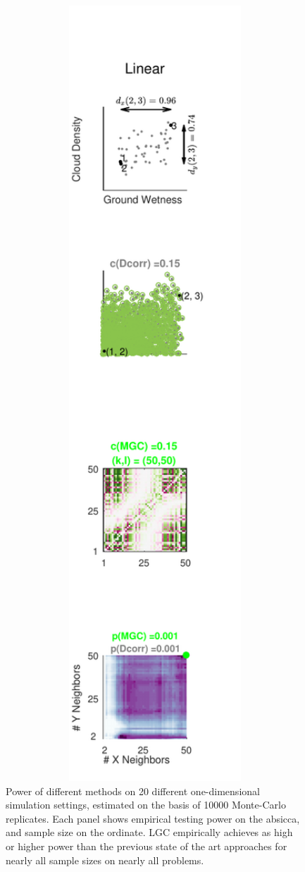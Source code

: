 \documentclass[11pt]{article}
\begin{document}
\begin{figure}[htbp]
\includegraphics[width=1.0\textwidth]{../Figures/Fig1}
\caption{
Power of different methods on 20 different one-dimensional simulation settings, estimated on the basis of  10000 Monte-Carlo replicates.
Each panel shows empirical testing power on the absicca, and sample size on the ordinate.
LGC empirically achieves as high or higher power than the previous state of the art approaches for nearly all sample sizes on nearly all problems.}
\label{fig:1D}
\end{figure}
\end{document}
